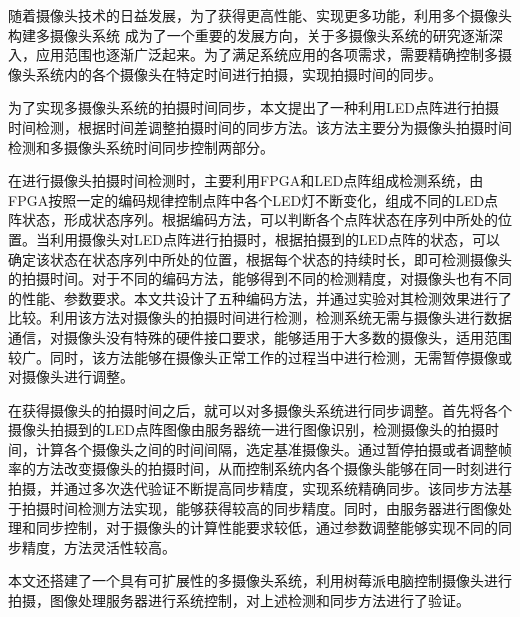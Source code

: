 \makeatletter
\ifthu@bachelor\relax\else
  \ifthu@doctor
  \else
    \ifthu@master
    \fi
  \fi
\fi
\makeatother



\begin{cabstract}

随着摄像头技术的日益发展，为了获得更高性能、实现更多功能，利用多个摄像头构建多摄像头系统 成为了一个重要的发展方向，关于多摄像头系统的研究逐渐深入，应用范围也逐渐广泛起来。为了满足系统应用的各项需求，需要精确控制多摄像头系统内的各个摄像头在特定时间进行拍摄，实现拍摄时间的同步。

为了实现多摄像头系统的拍摄时间同步，本文提出了一种利用LED点阵进行拍摄时间检测，根据时间差调整拍摄时间的同步方法。该方法主要分为摄像头拍摄时间检测和多摄像头系统时间同步控制两部分。

在进行摄像头拍摄时间检测时，主要利用FPGA和LED点阵组成检测系统，由FPGA按照一定的编码规律控制点阵中各个LED灯不断变化，组成不同的LED点阵状态，形成状态序列。根据编码方法，可以判断各个点阵状态在序列中所处的位置。当利用摄像头对LED点阵进行拍摄时，根据拍摄到的LED点阵的状态，可以确定该状态在状态序列中所处的位置，根据每个状态的持续时长，即可检测摄像头的拍摄时间。对于不同的编码方法，能够得到不同的检测精度，对摄像头也有不同的性能、参数要求。本文共设计了五种编码方法，并通过实验对其检测效果进行了比较。利用该方法对摄像头的拍摄时间进行检测，检测系统无需与摄像头进行数据通信，对摄像头没有特殊的硬件接口要求，能够适用于大多数的摄像头，适用范围较广。同时，该方法能够在摄像头正常工作的过程当中进行检测，无需暂停摄像或对摄像头进行调整。

在获得摄像头的拍摄时间之后，就可以对多摄像头系统进行同步调整。首先将各个摄像头拍摄到的LED点阵图像由服务器统一进行图像识别，检测摄像头的拍摄时间，计算各个摄像头之间的时间间隔，选定基准摄像头。通过暂停拍摄或者调整帧率的方法改变摄像头的拍摄时间，从而控制系统内各个摄像头能够在同一时刻进行拍摄，并通过多次迭代验证不断提高同步精度，实现系统精确同步。该同步方法基于拍摄时间检测方法实现，能够获得较高的同步精度。同时，由服务器进行图像处理和同步控制，对于摄像头的计算性能要求较低，通过参数调整能够实现不同的同步精度，方法灵活性较高。

本文还搭建了一个具有可扩展性的多摄像头系统，利用树莓派电脑控制摄像头进行拍摄，图像处理服务器进行系统控制，对上述检测和同步方法进行了验证。
\end{cabstract}

